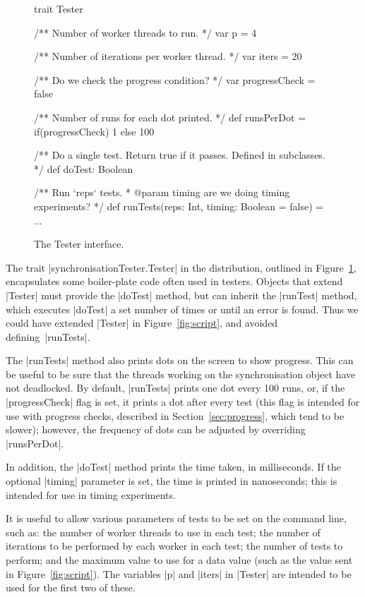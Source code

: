 
\begin{figure}
\begin{scala}
trait Tester{
  /** Number of worker threads to run. */
  var p = 4

  /** Number of iterations per worker thread. */
  var iters = 20

  /** Do we check the progress condition? */
  var progressCheck = false

  /** Number of runs for each dot printed. */
  def runsPerDot = if(progressCheck) 1 else 100

  /** Do a single test.  Return true if it passes.  Defined in subclasses.  */
  def doTest: Boolean

  /** Run `reps` tests.
    * @param timing are we doing timing experiments? */
  def runTests(reps: Int, timing: Boolean = false) = { ... }
}
\end{scala}
\caption{The {\scalashape Tester} interface.  \label{fig:tester}}
\end{figure}


The trait |synchronisationTester.Tester| in the distribution, outlined in
Figure~\ref{fig:tester}, encapsulates some boiler-plate code often used in
testers.  Objects that extend |Tester| must provide the |doTest| method, but
can inherit the |runTest| method, which executes |doTest| a set number of
times or until an error is found.  Thus we could have extended |Tester| in
Figure~\ref{fig:script}, and avoided defining~|runTests|.

The |runTests| method also prints dots on the screen to show progress.  This
can be useful to be sure that the threads working on the synchronisation
object have not deadlocked.  By default, |runTests| prints one dot every 100
runs, or, if the |progressCheck| flag is set, it prints a dot after every test
(this flag is intended for use with progress checks, described in
Section~\ref{sec:progress}, which tend to be slower); however, the frequency
of dots can be adjusted by overriding |runsPerDot|.

In addition, the |doTest| method prints the time taken, in milliseconds.  If
the optional |timing| parameter is set, the time is printed in nanoseconds;
this is intended for use in timing experiments.

It is useful to allow various parameters of tests to be set on the command
line, such as: the number of worker threads to use in each test; the number of
iterations to be performed by each worker in each test; the number of tests to
perform; and the maximum value to use for a data value (such as the value sent
in Figure~\ref{fig:script}).  The variables |p| and |iters| in |Tester| are
intended to be used for the first two of these.

